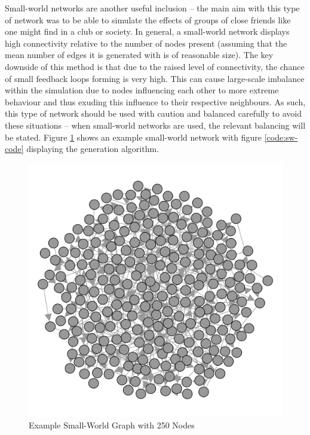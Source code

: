 \documentclass[]{report}
\begin{document}
Small-world networks are another useful inclusion – the main aim with this type of network was to be able to simulate the effects of groups of close friends like one might find in a club or society\cite{small-world}. In general, a small-world network displays high connectivity relative to the number of nodes present (assuming that the mean number of edges it is generated with is of reasonable size). The key downside of this method is that due to the raised level of connectivity, the chance of small feedback loops forming is very high. This can cause large-scale imbalance within the simulation due to nodes influencing each other to more extreme behaviour and thus exuding this influence to their respective neighbours. As such, this type of network should be used with caution and balanced carefully to avoid these situations – when small-world networks are used, the relevant balancing will be stated. Figure \ref{img:ex-small-world} shows an example small-world network with figure \ref{code:sw-code} displaying the generation algorithm.

\begin{figure}
\label{img:ex-small-world}
\begin{center}
\includegraphics[scale=0.25]{ex-small-world.png}
\end{center}
\caption{Example Small-World Graph with 250 Nodes}
\end{figure}
\end{document}
